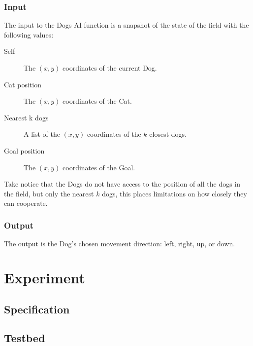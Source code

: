 \subsubsection{Input}
\label{sec:input}

The input to the Dogs AI function is a snapshot of the state of the field with
the following values:

\begin{description}
\item[Self] The \((x,y)\) coordinates of the current Dog.
\item[Cat position] The \((x,y)\) coordinates of the Cat.
\item[Nearest k dogs] A list of the \((x,y)\) coordinates of the \(k\) closest
  dogs.
\item[Goal position] The \((x,y)\) coordinates of the Goal.
\end{description}

Take notice that the Dogs do not have access to the position of all the dogs in
the field, but only the nearest \(k\) dogs, this places limitations on how
closely they can cooperate.

\subsubsection{Output}
\label{sec:output}

The output is the Dog's chosen movement direction: left, right, up, or down.

\section{Experiment}
\label{sec:experiment}


\subsection{Specification}
\label{sec:specification}

\subsection{Testbed}
\label{sec:testbed}



